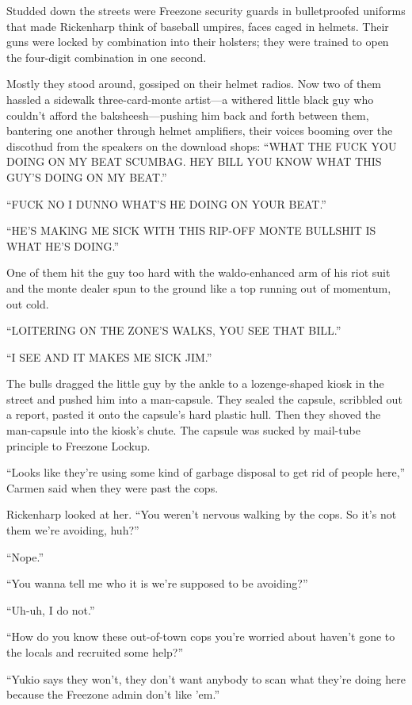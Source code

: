 Studded down the streets were Freezone security guards in bulletproofed uniforms that made Rickenharp think of baseball umpires, faces caged in helmets. Their guns were locked by combination into their holsters; they were trained to open the four-digit combination in one second.

Mostly they stood around, gossiped on their helmet radios. Now two of them hassled a sidewalk three-card-monte artist---a withered little black guy who couldn't afford the baksheesh---pushing him back and forth between them, bantering one another through helmet amplifiers, their voices booming over the discothud from the speakers on the download shops: ``WHAT THE FUCK YOU DOING ON MY BEAT SCUMBAG. HEY BILL YOU KNOW WHAT THIS GUY'S DOING ON MY BEAT.''

``FUCK NO I DUNNO WHAT'S HE DOING ON YOUR BEAT.''

``HE'S MAKlNG ME SICK WITH THIS RIP-OFF MONTE BULLSHIT IS WHAT HE'S DOING.''

One of them hit the guy too hard with the waldo-enhanced arm of his riot suit and the monte dealer spun to the ground like a top running out of momentum, out cold.

``LOITERING ON THE ZONE'S WALKS, YOU SEE THAT BILL.''

``I SEE AND IT MAKES ME SICK JIM.''

The bulls dragged the little guy by the ankle to a lozenge-shaped kiosk in the street and pushed him into a man-capsule. They sealed the capsule, scribbled out a report, pasted it onto the capsule's hard plastic hull. Then they shoved the man-capsule into the kiosk's chute. The capsule was sucked by mail-tube principle to Freezone Lockup.

``Looks like they're using some kind of garbage disposal to get rid of people here,'' Carmen said when they were past the cops.

Rickenharp looked at her. ``You weren't nervous walking by the cops. So it's not them we're avoiding, huh?''

``Nope.''

``You wanna tell me who it is we're supposed to be avoiding?''

``Uh-uh, I do not.''

``How do you know these out-of-town cops you're worried about haven't gone to the locals and recruited some help?''

``Yukio says they won't, they don't want anybody to scan what they're doing here because the Freezone admin don't like 'em.''

